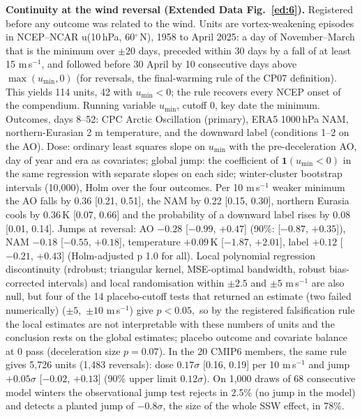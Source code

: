 \documentclass[11pt]{article}
\begin{document}
\textbf{Continuity at the wind reversal (Extended Data Fig.~\ref{ed:6}).} Registered before any outcome was related to the wind. Units are vortex-weakening episodes in NCEP–NCAR u(10\,hPa, 60$^\circ$\,N), 1958 to April 2025: a day of November–March that is the minimum over $\pm20$ days, preceded within 30 days by a fall of at least 15 m\,s$^{-1}$, and followed before 30 April by 10 consecutive days above $\max(u_{\min}, 0)$ (for reversals, the final-warming rule of the CP07 definition). This yields 114 units, 42 with $u_{\min} < 0$; the rule recovers every NCEP onset of the compendium. Running variable $u_{\min}$, cutoff 0, key date the minimum. Outcomes, days 8–52: CPC Arctic Oscillation (primary), ERA5 1000\,hPa NAM, northern-Eurasian 2 m temperature, and the downward label (conditions 1–2 on the AO). Dose: ordinary least squares slope on $u_{\min}$ with the pre-deceleration AO, day of year and era as covariates; global jump: the coefficient of $\mathbf{1}(u_{\min} < 0)$ in the same regression with separate slopes on each side; winter-cluster bootstrap intervals (10,000), Holm over the four outcomes. Per 10 m\,s$^{-1}$ weaker minimum the AO falls by 0.36 [0.21, 0.51], the NAM by 0.22 [0.15, 0.30], northern Eurasia cools by 0.36\,K [0.07, 0.66] and the probability of a downward label rises by 0.08 [0.01, 0.14]. Jumps at reversal: AO $-0.28$ [$-0.99$, $+0.47$] (90\%: [$-0.87$, $+0.35$]), NAM $-0.18$ [$-0.55$, $+0.18$], temperature $+0.09$\,K [$-1.87$, $+2.01$], label $+0.12$ [$-0.21$, $+0.43$] (Holm-adjusted p 1.0 for all). Local polynomial regression discontinuity (rdrobust\cite{calonico14}; triangular kernel, MSE-optimal bandwidth, robust bias-corrected intervals) and local randomisation within $\pm2.5$ and $\pm5$ m\,s$^{-1}$ are also null, but four of the 14 placebo-cutoff tests that returned an estimate (two failed numerically) ($\pm5{,}$ $\pm10$ m\,s$^{-1}$) give $p < 0.05,$ so by the registered falsification rule the local estimates are not interpretable with these numbers of units and the conclusion rests on the global estimates; placebo outcome and covariate balance at 0 pass (deceleration size $p = 0.07$). In the 20 CMIP6 members, the same rule gives 5,726 units (1,483 reversals): dose $0.17\sigma$ [0.16, 0.19] per 10 m\,s$^{-1}$ and jump $+0.05\sigma$ [$-0.02$, $+0.13$] (90\% upper limit $0.12\sigma$). On 1,000 draws of 68 consecutive model winters the observational jump test rejects in 2.5\% (no jump in the model) and detects a planted jump of $-0.8\sigma$, the size of the whole SSW effect, in 78\%.
\end{document}
